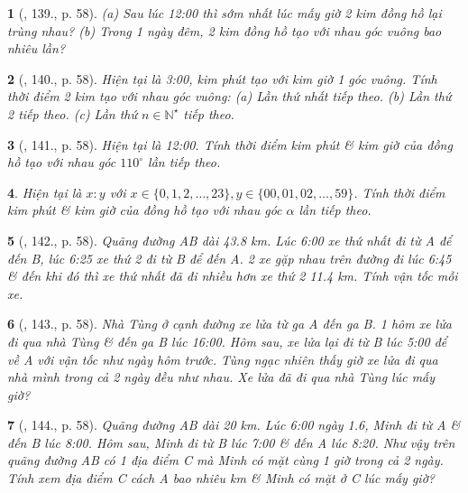 \documentclass{article}
\newtheorem{baitoan}{}
\begin{document}
\begin{baitoan}[\cite{Binh_Toan_6_tap_2}, 139., p. 58]
	(a) Sau lúc {\rm12:00} thì sớm nhất lúc mấy giờ 2 kim đồng hồ lại trùng nhau? (b) Trong 1 ngày đêm, 2 kim đồng hồ tạo với nhau góc vuông bao nhiêu lần?
\end{baitoan}

\begin{baitoan}[\cite{Binh_Toan_6_tap_2}, 140., p. 58]
	Hiện tại là {\rm3:00}, kim phút tạo với kim giờ 1 góc vuông. Tính thời điểm 2 kim tạo với nhau góc vuông: (a) Lần thứ nhất tiếp theo. (b) Lần thứ 2 tiếp theo. (c) Lần thứ $n\in\mathbb{N}^\star$ tiếp theo.
\end{baitoan}

\begin{baitoan}[\cite{Binh_Toan_6_tap_2}, 141., p. 58]
	Hiện tại là {\rm12:00}. Tính thời điểm kim phút \& kim giờ của đồng hồ tạo với nhau góc $110^\circ$ lần tiếp theo.
\end{baitoan}

\begin{baitoan}
	Hiện tại là $x:y$ với $x\in\{0,1,2,\ldots,23\},y\in\{00,01,02,\ldots,59\}$. Tính thời điểm kim phút \& kim giờ của đồng hồ tạo với nhau góc $\alpha$ lần tiếp theo.
\end{baitoan}

\begin{baitoan}[\cite{Binh_Toan_6_tap_2}, 142., p. 58]
	Quãng đường AB dài {\rm43.8 km}. Lúc {\rm6:00} xe thứ nhất đi từ A để đến B, lúc {\rm6:25} xe thứ 2 đi từ B để đến A. 2 xe gặp nhau trên đường đi lúc {\rm6:45} \& đến khi đó thì xe thứ nhất đã đi nhiều hơn xe thứ 2 {\rm11.4 km}. Tính vận tốc mỗi xe.
\end{baitoan}

\begin{baitoan}[\cite{Binh_Toan_6_tap_2}, 143., p. 58]
	Nhà Tùng ở cạnh đường xe lửa từ ga A đến ga B. 1 hôm xe lửa đi qua nhà Tùng \& đến ga B lúc {\rm16:00}. Hôm sau, xe lửa lại đi từ B lúc {\rm5:00} để về A với vận tốc như ngày hôm trước. Tùng ngạc nhiên thấy giờ xe lửa đi qua nhà mình trong cả 2 ngày đều như nhau. Xe lửa đã đi qua nhà Tùng lúc mấy giờ?
\end{baitoan}

\begin{baitoan}[\cite{Binh_Toan_6_tap_2}, 144., p. 58]
	Quãng đường AB dài {\rm20 km}. Lúc {\rm6:00} ngày 1.6, Minh đi từ A \& đến B lúc {\rm8:00}. Hôm sau, Minh đi từ B lúc {\rm7:00} \& đến A lúc {\rm8:20}. Như vậy trên quãng đường AB có 1 địa điểm C mà Minh có mặt cùng 1 giờ trong cả 2 ngày. Tính xem địa điểm C cách A bao nhiêu {\rm km} \& Minh có mặt ở C lúc mấy giờ?
\end{baitoan}
\end{document}
